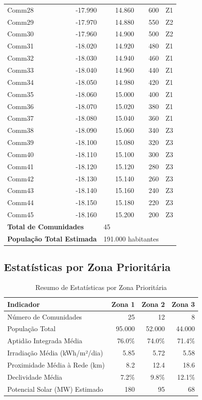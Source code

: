 \documentclass[12pt, a4paper]{article}
\begin{document}
{{{{{{{{{{{{\begin{table}[H]
\begin{tabular}{|l|r|r|r|r|}
Comm28 & -17.990 & 14.860 & 600 & Z1 \\
Comm29 & -17.970 & 14.880 & 550 & Z2 \\
Comm30 & -17.960 & 14.900 & 500 & Z2 \\
Comm31 & -18.020 & 14.920 & 480 & Z1 \\
Comm32 & -18.030 & 14.940 & 460 & Z1 \\
Comm33 & -18.040 & 14.960 & 440 & Z1 \\
Comm34 & -18.050 & 14.980 & 420 & Z1 \\
Comm35 & -18.060 & 15.000 & 400 & Z1 \\
Comm36 & -18.070 & 15.020 & 380 & Z1 \\
Comm37 & -18.080 & 15.040 & 360 & Z1 \\
Comm38 & -18.090 & 15.060 & 340 & Z3 \\
Comm39 & -18.100 & 15.080 & 320 & Z3 \\
Comm40 & -18.110 & 15.100 & 300 & Z3 \\
Comm41 & -18.120 & 15.120 & 280 & Z3 \\
Comm42 & -18.130 & 15.140 & 260 & Z3 \\
Comm43 & -18.140 & 15.160 & 240 & Z3 \\
Comm44 & -18.150 & 15.180 & 220 & Z3 \\
Comm45 & -18.160 & 15.200 & 200 & Z3 \\
\hline
\multicolumn{2}{|l|}{\textbf{Total de Comunidades}} & \multicolumn{2}{l|}{45} & \\
\multicolumn{2}{|l|}{\textbf{População Total Estimada}} & \multicolumn{2}{l|}{191.000 habitantes} & \\
\hline
\end{tabular}
\end{table}

\subsection{Estatísticas por Zona Prioritária}

\begin{table}[H]
\centering
\caption{Resumo de Estatísticas por Zona Prioritária}
\label{tab:zone_stats}
\begin{tabular}{|l|r|r|r|}
\hline
\textbf{Indicador} & \textbf{Zona 1} & \textbf{Zona 2} & \textbf{Zona 3} \\
\hline
Número de Comunidades & 25 & 12 & 8 \\
População Total & 95.000 & 52.000 & 44.000 \\
Aptidão Integrada Média & 76.0\% & 74.0\% & 71.4\% \\
Irradiação Média (kWh/m²/dia) & 5.85 & 5.72 & 5.58 \\
Proximidade Média à Rede (km) & 8.2 & 12.4 & 18.6 \\
Declividade Média & 7.2\% & 9.8\% & 12.1\% \\
Potencial Solar (MW) Estimado & 180 & 95 & 68 \\
\hline
\end{tabular}
\end{table}

}}}}}}}}}}}}
\end{document}
